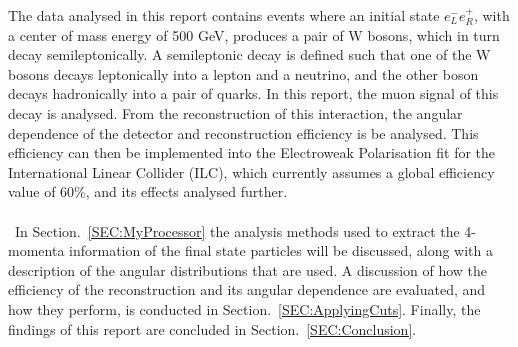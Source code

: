 The data analysed in this report contains events where an initial state ${e}_{L}^{-}{e}_{R}^{+}$, with a center of mass energy of 500 GeV, produces a pair of W bosons, which in turn decay semileptonically. A semileptonic decay is defined such that one of the W bosons decays leptonically into a lepton and a neutrino, and the other boson decays hadronically into a pair of quarks. In this report, the muon signal of this decay is analysed. From the reconstruction of this interaction, the angular dependence of the detector and reconstruction efficiency is be analysed. This efficiency can then be implemented into the Electroweak Polarisation fit for the International Linear Collider (ILC), which currently assumes a global efficiency value of 60\%, and its effects analysed further.
\\\\\
In Section.~\ref{SEC:MyProcessor} the analysis methods used to extract the 4-momenta information of the final state particles will be discussed, along with a description of the angular distributions that are used. A discussion of how the efficiency of the reconstruction and its angular dependence are evaluated, and how they perform, is conducted in Section.~\ref{SEC:ApplyingCuts}. Finally, the findings of this report are concluded in Section.~\ref{SEC:Conclusion}.
